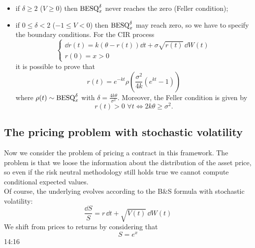 \begin{itemize}
    \item if $\delta \ge 2$ ($V\ge0$) then $\text{BESQ}^{\delta}_x$ never reaches the zero (Feller condition);
    \item if $0\le\delta<2$ ($-1\le V<0$) then $\text{BESQ}^{\delta}_x$ may reach zero, so we have to specify the boundary conditions. For the CIR process
    \begin{equation*}
        \begin{cases}
            \dd r(t) = k(\theta - r(t))\dd t + \sigma\sqrt{r(t)}\,\dd W(t) \\
            r(0) = x > 0
        \end{cases}
    \end{equation*}
    it is possible to prove that
    \begin{equation*}
        r(t) = e^{-kt}\rho\left(\frac{\sigma^2}{4k}(e^{kt}-1)\right)
    \end{equation*}
    where $\rho(t)\sim \text{BESQ}^{\delta}_x$ with $\delta = \tfrac{4k\theta}{\sigma^2}$. Moreover, the Feller condition is given by
    \begin{equation*}
        r(t) > 0\,\, \forall t \Leftrightarrow 2k\theta \ge \sigma^2.
    \end{equation*}
\end{itemize}

\subsection{The pricing problem with stochastic volatility}
Now we consider the problem of pricing a contract in this framework. The problem is that we loose the information about the distribution of the asset price, so even if the risk neutral methodology still holds true we cannot compute conditional expected values.\\
Of course, the underlying evolves according to the B\&S formula with stochastic volatility:
\begin{equation}
    \frac{\dd S}{S} = r\,\dd t + \sqrt{V(t)}\,\dd W(t)
\end{equation}
We shift from prices to returns by considering that
\begin{equation*}
    S = e^x
\end{equation*}
14:16
